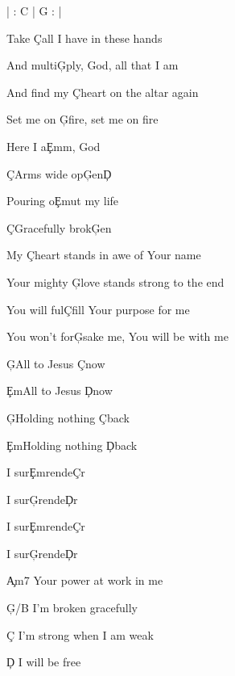 \documentclass[9pt]{extarticle}
\begin{document}
\bsong

\bi
| : C | G : |
\ei

\bv[2]
Take \c{C}all I have in these hands

And multi\c{G}ply, God, all that I am

And find my \c{C}heart on the altar again

Set me on \c{G}fire, set me on fire
\ev

\bc
Here I a\c{Em}m, God

\c{C}Arms wide op\c{G}en\c{D}

Pouring o\c{Em}ut my life

\c{C}Gracefully brok\c{G}en
\ec

\bv
My \c{C}heart stands in awe of Your name

Your mighty \c{G}love stands strong to the end

You will ful\c{C}fill Your purpose for me

You won't for\c{G}sake me, You will be with me
\ev


\bb[2]
\c{G}All to Jesus \c{C}now

\c{Em}All to Jesus \c{D}now

\c{G}Holding nothing \c{C}back

\c{Em}Holding nothing \c{D}back
\eb

\bb[2]
I sur\c{Em}rende\c{C}r

I sur\c{G}rende\c{D}r

I sur\c{Em}rende\c{C}r

I sur\c{G}rende\c{D}r
\eb


\bb[2]
\c{Am7} Your power at work in me

\c{G/B} I'm broken gracefully

\c{C} I'm strong when I am weak

\c{D} I will be free
\eb


\esong
\end{document}
